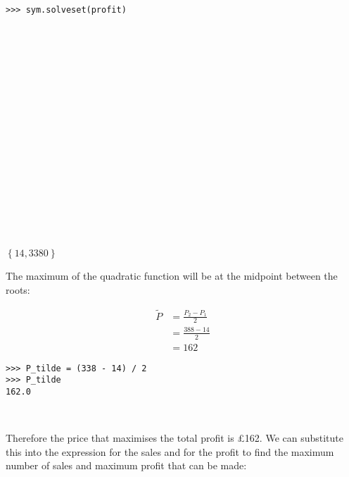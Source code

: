 \documentclass[12pt]{article}
\begin{document}
\begin{minipage}[t]{.32\textwidth} %
\begin{verbatim}
>>> sym.solveset(profit)




















\end{verbatim}
\vspace{-10.4cm}

\hspace{0.5cm}\begin{minipage}{\textwidth}$\left\{14, 3380\right\}$\end{minipage}
\end{minipage}

\vspace{0.5cm}

\begin{mdframed}[linewidth=0.5mm, backgroundcolor=orange!10]
The maximum of the quadratic function will be at the midpoint between the roots:
\end{mdframed}

\begin{minipage}[t]{.6\textwidth} %
\begin{mdframed}[linewidth=0.5mm, backgroundcolor=cyan!10]
\begin{align*}
\tilde{P} &= \frac{P_2 - P_1}{2} \\
&= \frac{388 - 14}{2} \\
&= 162
\end{align*}
\end{mdframed}
\end{minipage} %
\begin{minipage}[t]{.4\textwidth} %
\begin{verbatim}
>>> P_tilde = (338 - 14) / 2
>>> P_tilde
162.0



\end{verbatim}
\end{minipage}

\begin{mdframed}[linewidth=0.5mm, backgroundcolor=orange!10]
Therefore the price that maximises the total profit is £162. We can substitute this into the expression for the sales and for the profit to find the maximum number of sales and maximum profit that can be made:
\end{mdframed}
\end{document}
